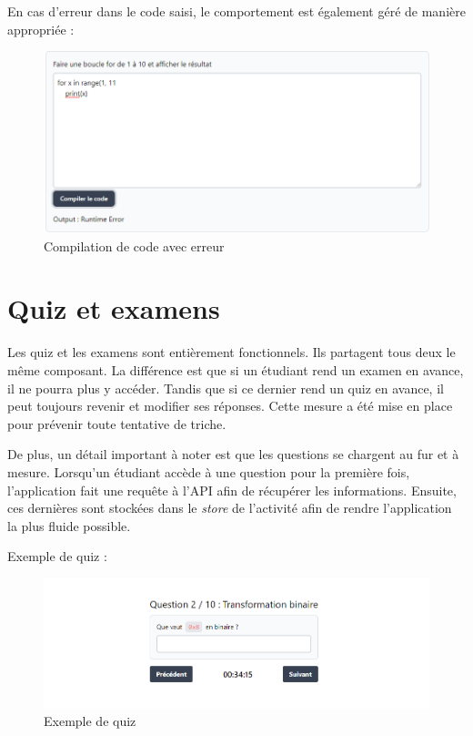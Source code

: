 En cas d'erreur dans le code saisi, le comportement est également géré de manière appropriée :
\begin{center}
    \begin{figure}[H]
        \includegraphics[width=\textwidth]{./assets/figures/codeCompilationError.png}
        \caption{Compilation de code avec erreur}
    \end{figure}
\end{center}

\section{Quiz et examens}
Les quiz et les examens sont entièrement fonctionnels. Ils partagent tous deux le même composant. La différence est que si un étudiant rend un examen en avance, il ne pourra plus y accéder. Tandis que si ce dernier rend un quiz en avance, il peut toujours revenir et modifier ses réponses. Cette mesure a été mise en place pour prévenir toute tentative de triche.

De plus, un détail important à noter est que les questions se chargent au fur et à mesure. Lorsqu'un étudiant accède à une question pour la première fois, l'application fait une requête à l'API afin de récupérer les informations. Ensuite, ces dernières sont stockées dans le \emph{store} de l'activité afin de rendre l'application la plus fluide possible.

Exemple de quiz :

\begin{center}
    \begin{figure}[H]
        \includegraphics[width=\textwidth]{./assets/figures/quizExample.png}
        \caption{Exemple de quiz}
    \end{figure}
\end{center}

